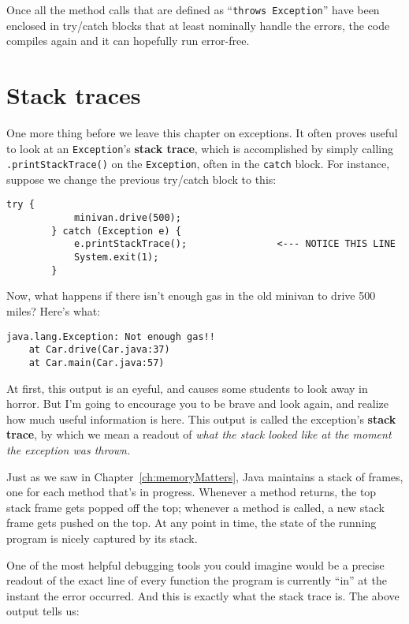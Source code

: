 Once all the method calls that are defined as ``\texttt{throws Exception}''
have been enclosed in try/catch blocks that at least nominally handle the
errors, the code compiles again and it can hopefully run error-free.

\section{Stack traces}

One more thing before we leave this chapter on exceptions. It often proves
useful to look at an \texttt{Exception}'s \textbf{stack trace}, which is
accomplished by simply calling \texttt{.printStackTrace()} on the
\texttt{Exception}, often in the \texttt{catch} block. For instance, suppose
we change the previous try/catch block to this:

\begin{Verbatim}[samepage=true,fontsize=\footnotesize,frame=single]
        try {
            minivan.drive(500);
        } catch (Exception e) {
            e.printStackTrace();                <--- NOTICE THIS LINE
            System.exit(1);
        }
\end{Verbatim}

Now, what happens if there isn't enough gas in the old minivan to drive 500
miles? Here's what:

\begin{Verbatim}[fontsize=\small,samepage=true,frame=none]
java.lang.Exception: Not enough gas!!
    at Car.drive(Car.java:37)
    at Car.main(Car.java:57)
\end{Verbatim}

At first, this output is an eyeful, and causes some students to look away in
horror. But I'm going to encourage you to be brave and look again, and realize
how much useful information is here. This output is called the exception's
\textbf{stack trace}, by which we mean a readout of \textit{what the stack
looked like at the moment the exception was thrown.}

Just as we saw in Chapter~\ref{ch:memoryMatters}, Java maintains a stack of
frames, one for each method that's in progress. Whenever a method returns, the
top stack frame gets popped off the top; whenever a method is called, a new
stack frame gets pushed on the top. At any point in time, the state of the
running program is nicely captured by its stack. 

One of the most helpful debugging tools you could imagine would be a precise
readout of the exact line of every function the program is currently ``in'' at
the instant the error occurred. And this is exactly what the stack trace is.
The above output tells us:


